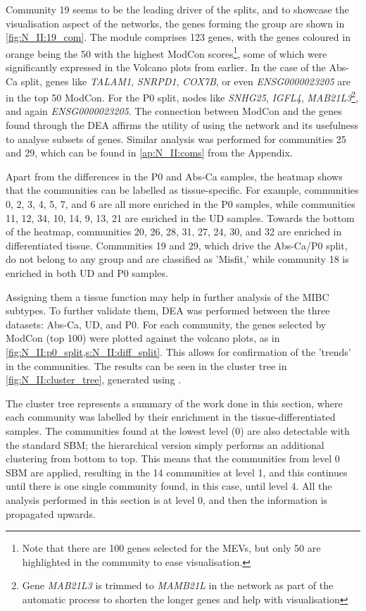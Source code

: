 Community 19 seems to be the leading driver of the splits, and to showcase the visualisation aspect of the networks, the genes forming the group are shown in \cref{fig:N_II:19_com}. The module comprises 123 genes, with the genes coloured in orange being the 50 with the highest ModCon scores\footnote{Note that there are 100 genes selected for the MEVs, but only 50 are highlighted in the community to ease visualisation.}, some of which were significantly expressed in the Volcano plots from earlier. In the case of the Abs-Ca split, genes like \textit{TALAM1}, \textit{SNRPD1}, \textit{COX7B}, or even \textit{ENSG0000023205} are in the top 50 ModCon. For the P0 split, nodes like \textit{SNHG25}, \textit{IGFL4}, \textit{MAB21L3}\footnote{Gene \textit{MAB21L3} is trimmed to \textit{MAMB21L} in the network as part of the automatic process to shorten the longer genes and help with visualisation}, and again \textit{ENSG0000023205}. The connection between ModCon and the genes found through the DEA affirms the utility of using the network and its usefulness to analyse subsets of genes. Similar analysis was performed for communities 25 and 29, which can be found in \cref{ap:N_II:coms} from the Appendix.



Apart from the differences in the P0 and Abs-Ca samples, the heatmap shows that the communities can be labelled as tissue-specific. For example, communities 0, 2, 3, 4, 5, 7, and 6 are all more enriched in the P0 samples, while communities 11, 12, 34, 10, 14, 9, 13, 21 are enriched in the UD samples. Towards the bottom of the heatmap, communities 20, 26, 28, 31, 27, 24, 30, and 32 are enriched in differentiated tissue. Communities 19 and 29, which drive the Abs-Ca/P0 split, do not belong to any group and are classified as 'Misfit,' while community 18 is enriched in both UD and P0 samples.


Assigning them a tissue function may help in further analysis of the MIBC subtypes. To further validate them, DEA was performed between the three datasets: Abs-Ca, UD, and P0. For each community, the genes selected by ModCon (top 100) were plotted against the volcano plots, as in \cref{fig:N_II:p0_split,s:N_II:diff_split}. This allows for confirmation of the 'trends' in the communities. The results can be seen in the cluster tree in \cref{fig:N_II:cluster_tree}, generated using \citet{Zappia2018-bt}.

The cluster tree represents a summary of the work done in this section, where each community was labelled by their enrichment in the tissue-differentiated samples. The communities found at the lowest level (0) are also detectable with the standard SBM; the hierarchical version simply performs an additional clustering from bottom to top. This means that the communities from level 0 SBM are applied, resulting in the 14 communities at level 1, and this continues until there is one single community found, in this case, until level 4. All the analysis performed in this section is at level 0, and then the information is propagated upwards.

